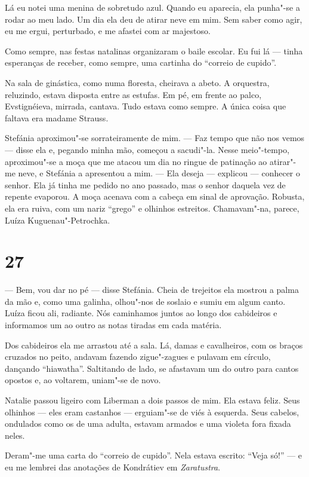 Lá eu notei uma menina de sobretudo azul. Quando eu aparecia, ela
punha"-se a rodar ao meu lado. Um dia ela deu de atirar neve em mim. Sem
saber como agir, eu me ergui, perturbado, e me afastei com ar majestoso.

Como sempre, nas festas natalinas organizaram o baile escolar. Eu fui lá
--- tinha esperanças de receber, como sempre, uma cartinha do ``correio
de cupido''.

Na sala de ginástica, como numa floresta, cheirava a abeto. A orquestra,
reluzindo, estava disposta entre as estufas. Em pé, em frente ao palco,
Evstignéieva, mirrada, cantava. Tudo estava como sempre. A única coisa
que faltava era madame Strauss.

Stefánia aproximou"-se sorrateiramente de mim. --- Faz tempo que não nos
vemos --- disse ela e, pegando minha mão, começou a sacudi"-la. Nesse
meio"-tempo, aproximou"-se a moça que me atacou um dia no ringue de
patinação ao atirar"-me neve, e Stefánia a apresentou a mim. --- Ela
deseja --- explicou --- conhecer o senhor. Ela já tinha me pedido no ano
passado, mas o senhor daquela vez de repente evaporou. A moça acenava
com a cabeça em sinal de aprovação. Robusta, ela era ruiva, com um nariz
``grego'' e olhinhos estreitos. Chamavam"-na, parece, Luíza
Kuguenau"-Petrochka.

\section{27}

--- Bem, vou dar no pé --- disse Stefánia. Cheia de trejeitos ela
mostrou a palma da mão e, como uma galinha, olhou"-nos de soslaio e sumiu
em algum canto. Luíza ficou ali, radiante. Nós caminhamos juntos ao
longo dos cabideiros e informamos um ao outro as notas tiradas em cada
matéria.

Dos cabideiros ela me arrastou até a sala. Lá, damas e cavalheiros, com
os braços cruzados no peito, andavam fazendo zigue"-zagues e pulavam em
círculo, dançando ``hiawatha''. Saltitando de lado, se afastavam um do
outro para cantos opostos e, ao voltarem, uniam"-se de novo.

Natalie passou ligeiro com Liberman a dois passos de mim. Ela estava
feliz. Seus olhinhos --- eles eram castanhos --- erguiam"-se de viés à
esquerda. Seus cabelos, ondulados como os de uma adulta, estavam armados
e uma violeta fora fixada neles.

Deram"-me uma carta do ``correio de cupido''. Nela estava escrito: ``Veja
só!'' --- e eu me lembrei das anotações de Kondrátiev em
\emph{Zaratustra}.

